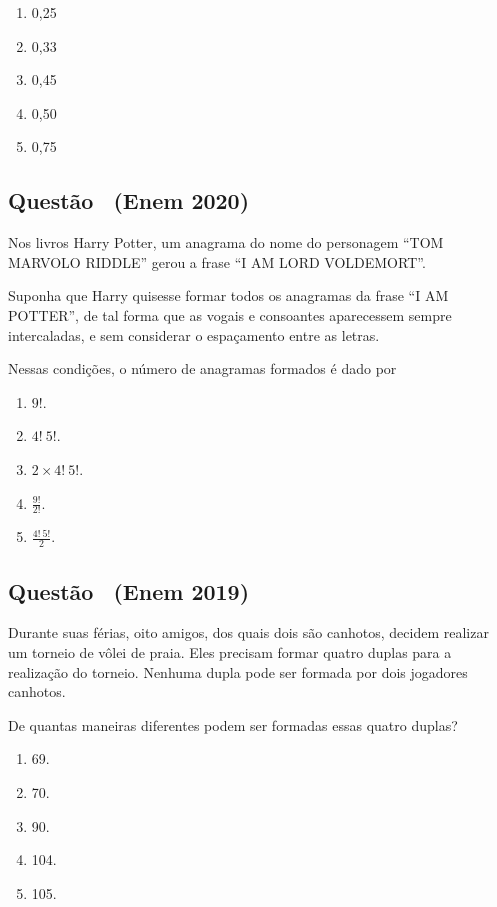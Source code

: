 \documentclass[12pt]{article}
\newcounter{questao}
\newcommand{\novaquestao}[1]{%
	\stepcounter{questao}%
	\subsection*{Questão \thequestao\ (#1)}%
}
\begin{document}
\begin{multicols}{2}
			\begin{enumerate}[label=(\alph*), noitemsep]
				\item 0,25
				\item 0,33
				\item 0,45
				\item 0,50
				\item 0,75
			\end{enumerate}
		
		\novaquestao{Enem 2020}

            Nos livros Harry Potter, um anagrama do nome do personagem “TOM MARVOLO RIDDLE” gerou a frase “I AM LORD VOLDEMORT”.
            
            Suponha que Harry quisesse formar todos os anagramas da frase “I AM POTTER”, de tal forma que as vogais e consoantes aparecessem sempre intercaladas, e sem considerar o espaçamento entre as letras.
            
            Nessas condições, o número de anagramas formados é dado por

                \begin{enumerate}[label=(\alph*) , noitemsep]
                \item $9!$.
                \item $4! \ 5!$.
                \item $2 \times 4! \ 5!$.
                \item $\frac{9!}{2!}$.
                \item $\frac{4! \ 5!}{2}$.
                \end{enumerate}
                        		
	\novaquestao{Enem 2019}

            Durante suas férias, oito amigos, dos quais dois são canhotos, decidem realizar um torneio de vôlei de praia. Eles precisam formar quatro duplas para a realização do torneio. Nenhuma dupla pode ser formada por dois jogadores canhotos.

            De quantas maneiras diferentes podem ser formadas
            essas quatro duplas?

                \begin{enumerate}[label=(\alph*), noitemsep]
                \item 69.
                \item 70.
                \item 90.
                \item 104.
                \item 105.
                \end{enumerate}


\end{multicols}
\end{document}
